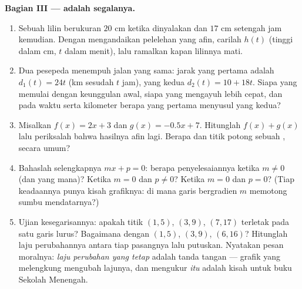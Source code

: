 \begin{problem}
\medskip
\noindent\textbf{Bagian III ---  adalah segalanya.}
\begin{enumerate}[resume]
  \item Sebuah lilin berukuran $20$ cm ketika dinyalakan dan $17$ cm
        setengah jam kemudian. Dengan mengandaikan pelelehan yang
        afin, carilah $h(t)$ (tinggi dalam cm, $t$ dalam menit), lalu
        ramalkan kapan lilinnya mati.
  \item Dua pesepeda menempuh jalan yang sama: jarak yang pertama
        adalah $d_1(t) = 24t$ (km sesudah $t$ jam), yang kedua
        $d_2(t) = 10 + 18t$. Siapa yang memulai dengan keunggulan
        awal, siapa yang mengayuh lebih cepat, dan pada waktu serta
        kilometer berapa yang pertama menyusul yang kedua?
  \item Misalkan $f(x) = 2x + 3$ dan $g(x) = -0.5x + 7$. Hitunglah
        $f(x) + g(x)$ lalu periksalah bahwa hasilnya afin lagi. Berapa
         dan titik potong sebuah , secara umum?
  \item Bahaslah selengkapnya  $mx + p = 0$: berapa
        penyelesaiannya ketika $m \neq 0$ (dan yang mana)? Ketika
        $m = 0$ dan $p \neq 0$? Ketika $m = 0$ dan $p = 0$? (Tiap
        keadaannya punya kisah grafiknya: di mana garis bergradien
        $m$ memotong sumbu mendatarnya?)
  \item Ujian kesegarisannya: apakah titik $(1, 5)$, $(3, 9)$,
        $(7, 17)$ terletak pada satu garis lurus? Bagaimana dengan
        $(1, 5)$, $(3, 9)$, $(6, 16)$? Hitunglah laju perubahannya
        antara tiap pasangnya lalu putuskan. Nyatakan pesan moralnya:
        \emph{laju perubahan yang tetap} adalah tanda tangan  --- grafik yang melengkung mengubah lajunya, dan
        mengukur \emph{itu} adalah kisah untuk buku Sekolah Menengah.

\end{enumerate}
\end{problem}
